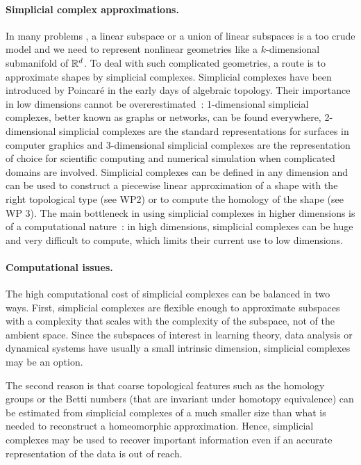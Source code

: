 \paragraph{Simplicial complex approximations.}
In many problems , a linear subspace or a union of linear subspaces is a too crude model and we need to represent nonlinear geometries like a $k$-dimensional submanifold of $\mathbb R^d$.  To deal with such complicated geometries, a route is to approximate shapes by simplicial complexes.  Simplicial complexes have been introduced by Poincar\'e in the early days of algebraic topology. Their importance in low dimensions cannot be overerestimated~: 1-dimensional simplicial complexes, better known as graphs or networks, can be found everywhere, 2-dimensional simplicial complexes are the standard representations for surfaces in computer graphics and 3-dimensional simplicial complexes are the representation of choice for scientific computing and numerical simulation when complicated domains are involved. Simplicial complexes can be defined in any dimension and can be used to construct a piecewise linear approximation of a shape with the right topological type (see WP2) or to 
compute the homology of the shape (see WP 3). The main bottleneck in using simplicial complexes in higher dimensions is of a computational nature~:  in high dimensions, simplicial complexes can be huge and very difficult to compute, which limits their current use to low dimensions.

\paragraph{Computational issues.}
The high computational cost of simplicial complexes can be balanced in two ways. First, simplicial complexes are flexible enough to approximate subspaces with a complexity that scales with the complexity of the subspace, not of the ambient space. Since the subspaces of interest 
 in learning theory, data analysis or dynamical systems have usually a small intrinsic dimension,
simplicial complexes may be an option.

The second reason is that coarse topological features such as the homology groups or the Betti numbers (that are invariant under homotopy equivalence) can be estimated from simplicial complexes of a much smaller size than what is needed to reconstruct a homeomorphic approximation. Hence, simplicial complexes may be used to recover important information even if an accurate representation of the data is out of reach.

